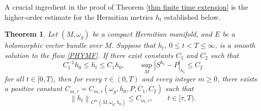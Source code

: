 \documentclass[12pt, reqno]{amsart}
\theoremstyle{plain}
\newtheorem{thm}{Theorem}[section]
\theoremstyle{definition}
\newcommand{\btheorem}{\begin{thm}}
\newcommand{\etheorem}{\end{thm}}
\newcommand{\beq}{\begin{equation}}
\newcommand{\eeq}{\end{equation}}
\renewcommand{\>}{\rightarrow}
\renewcommand{\>}{\rightarrow}
\numberwithin{equation}{section} %
\begin{document}
\noindent A crucial ingredient in the proof of Theorem \ref{thm finite time extension} is the higher-order estimate for the Hermitian metrics $h_t$ established below.

\btheorem\label{parabolicbootstrap}
Let $(M,\omega_g)$ be a compact Hermitian manifold, and $E$ be a holomorphic vector bundle over $M$.
Suppose that  $h_t$, $0\leq t<T\leq \infty$, is a smooth solution to the flow \eqref{PHYMF}. If there exist constants $C_1$ and $C_2$ such that
\beq
C_1^{-1}h_0\leq h_t\leq C_1h_0,
\qquad
\sup_M\left|S^{h_t}-P\right|_{h_t}\leq C_2
\eeq
for all $t\in[0,T)$, then for every $\tau\in (0, T)$ and every integer $m\geq 0$, there exists a positive constant $C_{m,\tau}=C_{m,\tau}(\omega_g,h_0,P,C_1,C_2)$ such that
\beq
\left\|h_t\right\|_{C^{m}(M,\omega_g, h_0)}\leq C_{m,\tau},
\qquad t\in[\tau,T).
\label{uniform parabolic bootstrapping estimate}
\eeq
\etheorem
\end{document}
